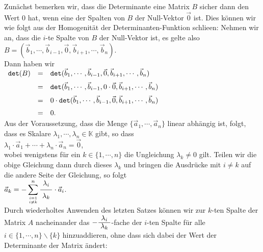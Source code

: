 \proof
Zun\"achst bemerken wir, dass die Determinante eine Matrix $B$ sicher dann den Wert $0$ hat, wenn eine
der Spalten von $B$ der Null-Vektor $\vec{0}$ ist.  Dies k\"onnen wir wie folgt aus der Homogenit\"at
der Determinanten-Funktion schlie\3en: Nehmen wir an, dass die $i$-te Spalte von $B$ der Null-Vektor
ist, es gelte also
\\[0.2cm]
\hspace*{1.3cm}
$B = (\vec{b}_1,\cdots, \vec{b}_{i-1}, \vec{0}, \vec{b}_{i+1}, \cdots, \vec{b}_n)$.
\\[0.2cm]
Dann haben wir 
\\[0.2cm]
\hspace*{1.3cm}
$
\begin{array}[t]{lcl}
 \mathtt{det}(B) & = & \mathtt{det}(\vec{b}_1,\cdots, \vec{b}_{i-1}, \vec{0}, \vec{b}_{i+1}, \cdots, \vec{b}_n) \\[0.2cm] 
                 & = & \mathtt{det}(\vec{b}_1,\cdots, \vec{b}_{i-1}, 0 \cdot \vec{0}, \vec{b}_{i+1}, \cdots, \vec{b}_n) \\[0.2cm]  
                 & = & 0 \cdot \mathtt{det}(\vec{b}_1,\cdots, \vec{b}_{i-1}, \vec{0}, \vec{b}_{i+1}, \cdots, \vec{b}_n) \\[0.2cm]  
                 & = & 0.
\end{array}
$
\\[0.2cm]
Aus der Voraussetzung, dass die Menge $\{\vec{a}_1, \cdots, \vec{a}_n\}$ linear abh\"angig ist, folgt,
dass es Skalare $\lambda_1,\cdots, \lambda_n \in \mathbb{K}$ gibt, so dass 
\\[0.2cm]
\hspace*{1.3cm}
$\lambda_1 \cdot \vec{a}_1 + \cdots + \lambda_n \cdot \vec{a}_n = \vec{0}$,
\\[0.2cm]
wobei wenigstens f\"ur ein $k \in \{1,\cdots,n\}$ die Ungleichung $\lambda_k \not= 0$ gilt.
Teilen wir die obige Gleichung dann durch dieses $\lambda_k$ und bringen die Ausdr\"ucke mit $i\not=k$
auf die andere Seite der Gleichung, so folgt
\\[0.2cm]
\hspace*{1.3cm}
$\ds\vec{a}_k = - \sum\limits_{i=1 \atop i \not= k}^n \bruch{\lambda_i}{\lambda_k} \cdot \vec{a}_i$.
\\[0.2cm]
Durch wiederholtes Anwenden des letzten Satzes k\"onnen wir zur $k$-ten Spalte der Matrix $A$
nacheinander das $-\bruch{\lambda_i}{\lambda_k}$-fache der $i$-ten Spalte f\"ur alle $i \in \{1,\cdots,n\} \backslash \{k\}$ 
hinzuaddieren, ohne dass sich dabei der Wert der Determinante der Matrix \"andert:
